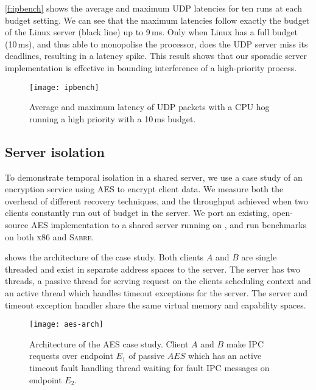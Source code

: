 \autoref{f:ipbench} shows the average and maximum \gls{UDP} latencies for
ten runs at each budget setting. We can see that the maximum latencies
follow exactly the budget of the Linux server (black line) up to 9\,ms. Only
when Linux has a full budget (10\,ms), and thus able to monopolise the
processor, does the UDP server miss its deadlines, resulting in a
latency spike.  This result shows that our sporadic server implementation is effective in bounding
interference of a high-priority process.

\begin{figure}[h]
  \centering
  \texttt{[image: ipbench]}
  \caption[Results of ipbench isolation benchmark.]{Average and maximum latency of UDP packets with a CPU hog running a high priority with a 10\,ms budget.}
  \label{f:ipbench}
\end{figure}

\subsection{Server isolation} 
\label{s:server-isolation}

To demonstrate temporal isolation in a shared server, we use a case study of an encryption service
using \gls{AES} to encrypt client data. We measure both the overhead of different
recovery techniques, and the throughput achieved when two clients constantly run out of budget in the server. 
We port an existing, open-source \gls{AES} implementation to a shared server running on \selfour, and run
benchmarks on both \textsc{x86} and \textsc{Sabre}.

 shows the architecture of the case study. Both clients $A$ and $B$ are single
 threaded and exist in separate address spaces to the server. The server has two threads, a passive
 thread for serving request on the clients scheduling context and an active thread which handles
 timeout exceptions for the server. The server and timeout exception handler share the same virtual
 memory and capability spaces.

\begin{figure}
\centering
\texttt{[image: aes-arch]}
\caption[Architecture of the AES case study.]{Architecture of the \gls{AES} case study. Client $A$ and $B$ make \gls{IPC} requests over
endpoint $E_{1}$ of passive $AES$ which has an active timeout fault handling thread waiting for
fault \gls{IPC} messages on endpoint $E_{2}$.}
\label{f:aes-arch}
\end{figure}

